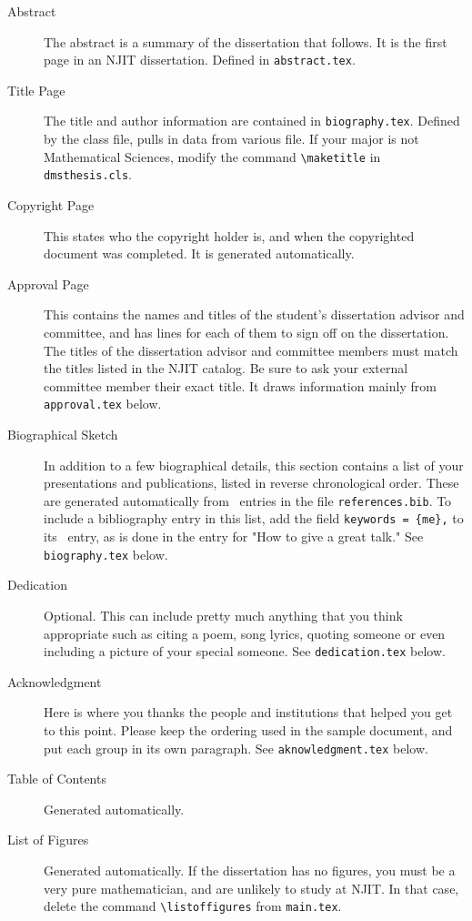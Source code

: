 \begin{description}
\item [Abstract] The abstract is a summary of the dissertation that follows. It is the first page in an NJIT dissertation. Defined in \texttt{abstract.tex}.
%
\item [Title Page]The title and author information are contained in \texttt{biography.tex}.  Defined by the class file, pulls in data from various file. If your major is not Mathematical Sciences, modify the command \verb#\maketitle# in \texttt{dmsthesis.cls}.
%
\item [Copyright Page] This states who the copyright holder is, and when the copyrighted document was completed. It is generated automatically.
%
\item [Approval Page] This contains the names and titles of the student's dissertation advisor and committee, and has lines for each of them to sign off on the dissertation. The titles of the dissertation advisor and committee members must match the titles listed in the NJIT catalog. Be sure to ask your external committee member their exact title.  It draws information mainly from \texttt{approval.tex} below.
\item [Biographical Sketch] In addition to a few biographical details, this section contains a list of your presentations and publications, listed in reverse chronological order. These are generated automatically from \BibTeX\ entries in the file \texttt{references.bib}. To include a bibliography entry in this list, add the field \verb+keywords = {me},+ to its \BibTeX\ entry, as is done in the entry for "How to give a great talk." See \texttt{biography.tex} below.
%
\item [Dedication] Optional. This can include pretty much anything that you think appropriate such as citing a poem, song lyrics, quoting someone or even including a picture of your special someone. See \texttt{dedication.tex} below.
%
\item [Acknowledgment] Here is where you thanks the people and institutions that helped you get to this point. Please keep the ordering used in the sample document, and put each group in its own paragraph. See \texttt{aknowledgment.tex} below.
%
\item [Table of Contents] Generated automatically.
%
\item [List of Figures] Generated automatically. If the dissertation has no figures, you must be a very pure mathematician, and are unlikely to study at NJIT. In that case, delete the command \verb+\listoffigures+ from \texttt{main.tex}.

\end{description}

